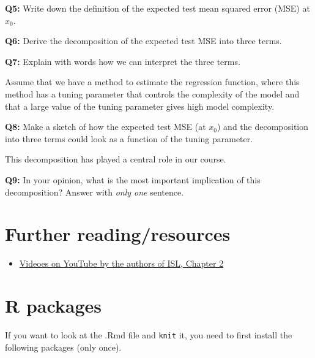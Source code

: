 \documentclass[]{article}
\providecommand{\tightlist}{%
  \setlength{\itemsep}{0pt}\setlength{\parskip}{0pt}}
\begin{document}
\textbf{Q5:} Write down the definition of the expected test mean squared
error (MSE) at \(x_0\).

\textbf{Q6:} Derive the decomposition of the expected test MSE into
three terms.

\textbf{Q7:} Explain with words how we can interpret the three terms.

Assume that we have a method to estimate the regression function, where
this method has a tuning parameter that controls the complexity of the
model and that a large value of the tuning parameter gives high model
complexity.

\textbf{Q8:} Make a sketch of how the expected test MSE (at \(x_0\)) and
the decomposition into three terms could look as a function of the
tuning parameter.

This decomposition has played a central role in our course.

\textbf{Q9:} In your opinion, what is the most important implication of
this decomposition? Answer with \emph{only one} sentence.

\hypertarget{further-readingresources}{%
\section{ Further reading/resources}\label{further-readingresources}}

\begin{itemize}
\tightlist
\item
  \href{https://www.youtube.com/playlist?list=PL5-da3qGB5IDvuFPNoSqheihPOQNJpzyy}{Videoes
  on YouTube by the authors of ISL, Chapter 2}
\end{itemize}

\hypertarget{r-packages}{%
\section{ R packages}\label{r-packages}}

If you want to look at the .Rmd file and \texttt{knit} it, you need to
first install the following packages (only once).
\end{document}
